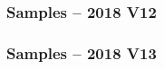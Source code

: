 \documentclass{beamer}
\newcommand{\beginbackup}{
  \newcounter{framenumbervorappendix}
  \setcounter{framenumbervorappendix}{\value{framenumber}}
}
\newcommand{\backupend}{
  \addtocounter{framenumbervorappendix}{-\value{framenumber}}
  \addtocounter{framenumber}{\value{framenumbervorappendix}}
}
\begin{document}
\begin{frame}
  \frametitle{Samples -- 2018 V12}

  
    
\end{frame}

\begin{frame}
  \frametitle{Samples -- 2018 V13}

  
    
\end{frame}


\begin{comment}
\beginbackup

\begin{frame}
  \centering
    {\Huge \bf\sffamily Backup Slides}
\end{frame}



\backupend
\end{comment}
\end{document}
